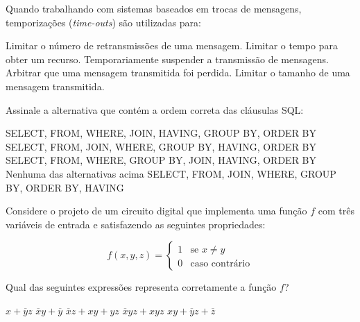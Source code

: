 \documentclass[12pt, addpoints]{exam}
\begin{document}
\begin{questions}
\question
Quando trabalhando com sistemas baseados em trocas de mensagens, temporizações (\textit{time-outs}) são utilizadas para:

\begin{choices}
\choice Limitar o número de retransmissões de uma mensagem.
\choice Limitar o tempo para obter um recurso.
\choice Temporariamente suspender a transmissão de mensagens.
\choice Arbitrar que uma mensagem transmitida foi perdida.
\choice Limitar o tamanho de uma mensagem transmitida.
\end{choices}

\question
Assinale a alternativa que contém a ordem correta das cláusulas SQL:

\begin{choices}
\choice SELECT, FROM, WHERE, JOIN, HAVING, GROUP BY, ORDER BY
\choice SELECT, FROM, JOIN, WHERE, GROUP BY, HAVING, ORDER BY
\choice SELECT, FROM, WHERE, GROUP BY, JOIN, HAVING, ORDER BY
\choice Nenhuma das alternativas acima
\choice SELECT, FROM, JOIN, WHERE, GROUP BY, ORDER BY, HAVING
\end{choices}

\question
Considere o projeto de um circuito digital que implementa uma função \( f \) com três variáveis de entrada e satisfazendo as seguintes propriedades:

\[
f(x, y, z) = 
\begin{cases} 
1 & \text{se } x \neq y \\ 
0 & \text{caso contrário} 
\end{cases}
\]

Qual das seguintes expressões representa corretamente a função \( f \)?
\begin{choices}
\choice \( x + \overline{y}z \)
\choice \( \overline{x}y + \overline{y} \)
\choice \( \overline{x}z + xy + yz \)
\choice \( \overline{x}y z + x y z \)
\choice \( xy + \overline{y}z + \overline{z} \)
\end{choices}



    \end{questions}
    
\end{document}
